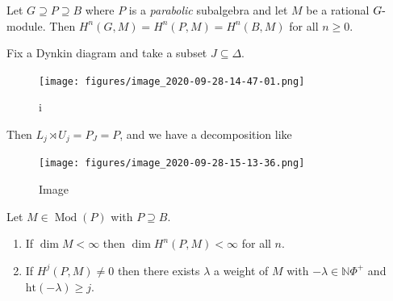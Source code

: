 \begin{corollary}[?]

\begin{corollary}[?]

Let \(G \supseteq P \supseteq B\) where \(P\) is a \emph{parabolic}
subalgebra and let \(M\) be a rational \(G{\hbox{-}}\)module. Then
\(H^n(G, M) = H^n(P, M) = H^n(B, M)\) for all \(n \geq 0\).

\end{corollary}

\end{corollary}

\begin{example}

\begin{example}

Fix a Dynkin diagram and take a subset \(J\subseteq \Delta\).

\begin{figure}
\centering
\texttt{[image: figures/image\_2020-09-28-14-47-01.png]}
\caption{i}
\end{figure}

Then \(L_j\rtimes U_j = P_J = P\), and we have a decomposition like

\begin{figure}
\centering
\texttt{[image: figures/image\_2020-09-28-15-13-36.png]}
\caption{Image}
\end{figure}

\end{example}

\end{example}

\begin{proposition}[?]

\begin{proposition}[?]

Let \(M\in {\operatorname{Mod}}(P)\) with \(P\supseteq B\).

\begin{enumerate}
\def\labelenumi{\alph{enumi}.}
\item
  If \(\dim M < \infty\) then \(\dim H^n(P, M) < \infty\) for all \(n\).
\item
  If \(H^j(P, M) \neq 0\) then there exists \(\lambda\) a weight of
  \(M\) with \(-\lambda \in {\mathbb{N}}\Phi^+\) and
  \(\text{ht}(-\lambda) \geq j\).
\end{enumerate}

\end{proposition}

\end{proposition}

